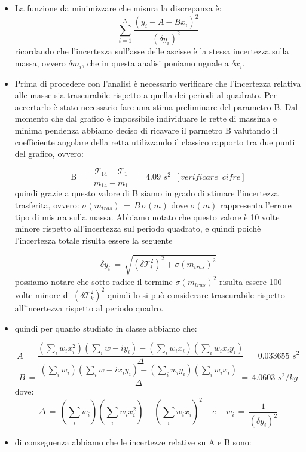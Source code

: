 \begin{itemize}
\item{La funzione da minimizzare che misura la discrepanza è:
		\begin{equation*}
			\sum_{i=1}^{N} \frac{(y_i - A - Bx_i)^2}{(\delta y_i)^2}
		\end{equation*}
		ricordando che l'incertezza sull'asse delle ascisse è la stessa incertezza sulla massa, ovvero $\delta m_i$, che in questa analisi poniamo uguale a $\delta x_i$.}
\item{Prima di procedere con l'analisi è necessario verificare che l'incertezza relativa alle masse sia trascurabile rispetto a quella dei periodi al quadrato. Per accertarlo è stato necessario fare una stima preliminare del parametro B. Dal momento che dal grafico è impossibile individuare le rette di massima e minima pendenza abbiamo deciso di ricavare il parmetro B valutando il coefficiente angolare della retta utilizzando il classico rapporto tra due punti del grafico, ovvero:

	\begin{equation*}
		\text{B} \,\,=\,\, \frac{\mathcal{T}_{14} - \mathcal{T}_{1}}{m_{14} - m_1} \,\,=\,\, 4.09 \,\, s^2 \,\,\,[verificare \,\,\,cifre]
	\end{equation*}
	quindi grazie a questo valore di B siamo in grado di stimare l'incertezza trasferita, ovvero: $\sigma (m_{tras}) \,=\, B \, \sigma (m)$ dove $\sigma (m)$ rappresenta l'errore tipo di misura sulla massa. Abbiamo notato che questo valore è 10 volte minore rispetto all'incertezza sul periodo quadrato, e quindi poichè l'incertezza totale risulta essere la seguente
	
	\begin{equation*}
		\delta y_i \,=\, \sqrt{(\delta \mathcal{T}_i^2)^2 + \sigma (m_{tras})^2} 
	\end{equation*}	
	possiamo notare che sotto radice il termine $\sigma (m_{tras})^2$ risulta essere 100 volte minore di $(\delta \mathcal{T}_k^2)^2$ quindi lo si può considerare trascurabile rispetto all'incertezza rispetto al periodo quadro.
	}
\item{quindi per quanto studiato in classe abbiamo che:

		\begin{equation*}
			A \,=\, \frac{(\sum_i w_i x_i^2)(\sum_i w-i y_i) - (\sum_i w_i x_i)(\sum_i w_i x_i y_i)}{\Delta} \,=\, 0.033655 \,\, s^2
		\end{equation*}
		\begin{equation*}
			B \,=\, \frac{(\sum_i w_i)(\sum_i w-i x_i y_i) - (\sum_i w_i y_i)(\sum_i w_i x_i)}{\Delta} \,=\, 4.0603 \,\, s^2 / kg
		\end{equation*}
		dove:
		\begin{equation*}
			\Delta \,=\, (\sum_i w_i)(\sum_i w_i x_i^2) - (\sum_i w_i x_i)^2 \,\,\,\,\,\,\, e \,\,\,\,\,\,\,
			w_i \,=\, \frac{1}{(\delta y_i)^2}
		\end{equation*}}
\item{di conseguenza abbiamo che le incertezze relative su A e B sono:

}
\end{itemize}
